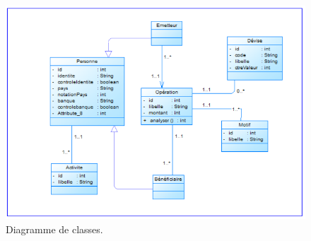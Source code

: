 \begin{figure}[h!]
\begin{center}
\includegraphics[width=14cm]
{images/classe.PNG}
\caption{Diagramme de classes.\label{fig:classe}}
\end{center}
\end{figure}

